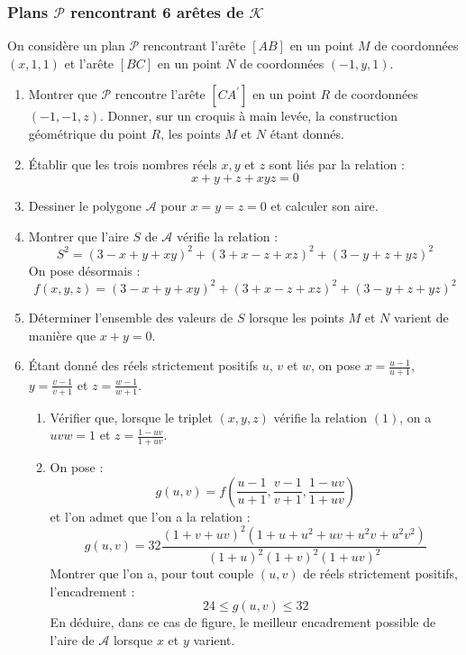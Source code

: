 \documentclass[landscape,twocolumn,leqno,a4paper,10pt]{report} %
\newcommand\n{\noindent}
\renewcommand{\leq}{\leqslant}
\begin{document}
\subsubsection{Plans $\mathscr{P}$ rencontrant 6 arêtes de $\mathscr{K}$}

\n On considère un plan $\mathscr{P}$ rencontrant l'arête $[A B]$ en un point $M$ de coordonnées $(x, 1,1)$ et l'arête $[B C]$ en un point $N$ de coordonnées $(-1, y, 1)$.

\begin{enumerate}
	\item Montrer que $\mathscr{P}$ rencontre l'arête $\left[C A^{\prime}\right]$ en un point $R$ de coordonnées $(-1,-1, z)$. Donner, sur un croquis à main levée, la construction géométrique du point $R$, les points $M$ et $N$ étant donnés.
	\item Établir que les trois nombres réels $x, y$ et $z$ sont liés par la relation :
	\begin{equation}\tag{1}
	x+y+z+x y z=0
	\end{equation}
	\item Dessiner le polygone $\mathscr{A}$ pour $x=y=z=0$ et calculer son aire.
	\item Montrer que l'aire $S$ de $\mathscr{A}$ vérifie la relation :
	$$S^{2}=(3-x+y+x y)^{2}+(3+x-z+x z)^{2}+(3-y+z+y z)^{2}$$
	On pose désormais :
	$$f(x, y, z)=(3-x+y+x y)^{2}+(3+x-z+x z)^{2}+(3-y+z+y z)^{2}$$
	\item Déterminer l'ensemble des valeurs de $S$ lorsque les points $M$ et $N$ varient de manière que $x+y=0$.
	\item Étant donné des réels strictement positifs $u$, $v$ et $w$, on pose $x=\frac{u-1}{u+1}$, $y=\frac{v-1}{v+1}$ et $z=\frac{w-1}{w+1}$.
	\begin{enumerate}
		\item Vérifier que, lorsque le triplet $(x, y, z)$ vérifie la relation $(1)$, on a $u v w=1$ et $z=\frac{1-u v}{1+u v}$.
		\item On pose :
		$$g(u, v)=f\left(\frac{u-1}{u+1}, \frac{v-1}{v+1}, \frac{1-u v}{1+u v}\right)$$
		et l'on admet que l'on a la relation :
		$$g(u, v)=32 \frac{(1+v+u v)^{2}\left(1+u+u^{2}+u v+u^{2} v+u^{2} v^{2}\right)}{(1+u)^{2}(1+v)^{2}(1+u v)^{2}}$$
		Montrer que l'on a, pour tout couple $(u, v)$ de réels strictement positifs, l'encadrement :
		$$24 \leq g(u, v) \leq 32$$
		En déduire, dans ce cas de figure, le meilleur encadrement possible de l'aire de $\mathscr{A}$ lorsque $x$ et $y$ varient.
	\end{enumerate}
\end{enumerate}
\end{document}
